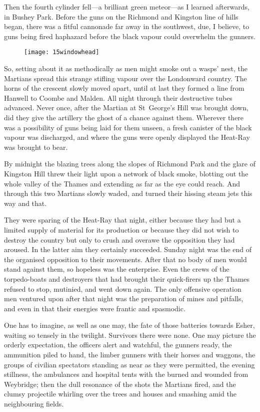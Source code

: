 Then the fourth cylinder fell—a brilliant green meteor—as I learned afterwards, in Bushey Park. Before the guns on the Richmond and Kingston line of hills began, there was a fitful cannonade far away in the southwest, due, I believe, to guns being fired haphazard before the black vapour could overwhelm the gunners.

\begin{figure}[tb!]
\centering
\texttt{[image: 15windowhead]}
\end{figure}

So, setting about it as methodically as men might smoke out a wasps' nest, the Martians spread this strange stifling vapour over the Londonward country. The horns of the crescent slowly moved apart, until at last they formed a line from Hanwell to Coombe and Malden. All night through their destructive tubes advanced. Never once, after the Martian at St~George's Hill was brought down, did they give the artillery the ghost of a chance against them. Wherever there was a possibility of guns being laid for them unseen, a fresh canister of the black vapour was discharged, and where the guns were openly displayed the Heat-Ray was brought to bear.

By midnight the blazing trees along the slopes of Richmond Park and the glare of Kingston Hill threw their light upon a network of black smoke, blotting out the whole valley of the Thames and extending as far as the eye could reach. And through this two Martians slowly waded, and turned their hissing steam jets this way and that.

They were sparing of the Heat-Ray that night, either because they had but a limited supply of material for its production or because they did not wish to destroy the country but only to crush and overawe the opposition they had aroused. In the latter aim they certainly succeeded. Sunday night was the end of the organised opposition to their movements. After that no body of men would stand against them, so hopeless was the enterprise. Even the crews of the torpedo-boats and destroyers that had brought their quick-firers up the Thames refused to stop, mutinied, and went down again. The only offensive operation men ventured upon after that night was the preparation of mines and pitfalls, and even in that their energies were frantic and spasmodic.

One has to imagine, as well as one may, the fate of those batteries towards Esher, waiting so tensely in the twilight. Survivors there were none. One may picture the orderly expectation, the officers alert and watchful, the gunners ready, the ammunition piled to hand, the limber gunners with their horses and waggons, the groups of civilian spectators standing as near as they were permitted, the evening stillness, the ambulances and hospital tents with the burned and wounded from Weybridge; then the dull resonance of the shots the Martians fired, and the clumsy projectile whirling over the trees and houses and smashing amid the neighbouring fields.

